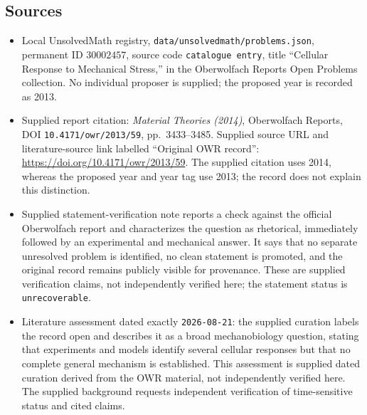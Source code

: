 \documentclass[11pt]{article}
\begin{document}
\subsection{Sources}
\begin{itemize}
\item Local UnsolvedMath registry, \texttt{data/unsolvedmath/problems.json}, permanent ID \(30002457\), source code \texttt{catalogue entry}, title ``Cellular Response to Mechanical Stress,'' in the Oberwolfach Reports Open Problems collection. No individual proposer is supplied; the proposed year is recorded as 2013.
\item Supplied report citation: \emph{Material Theories (2014)}, Oberwolfach Reports, DOI \texttt{10.4171/owr/2013/59}, pp.\ 3433--3485. Supplied source URL and literature-source link labelled ``Original OWR record'': \url{https://doi.org/10.4171/owr/2013/59}. The supplied citation uses 2014, whereas the proposed year and year tag use 2013; the record does not explain this distinction.
\item Supplied statement-verification note reports a check against the official Oberwolfach report and characterizes the question as rhetorical, immediately followed by an experimental and mechanical answer. It says that no separate unresolved problem is identified, no clean statement is promoted, and the original record remains publicly visible for provenance. These are supplied verification claims, not independently verified here; the statement status is \texttt{unrecoverable}.
\item Literature assessment dated exactly \texttt{2026-08-21}: the supplied curation labels the record open and describes it as a broad mechanobiology question, stating that experiments and models identify several cellular responses but that no complete general mechanism is established. This assessment is supplied dated curation derived from the OWR material, not independently verified here. The supplied background requests independent verification of time-sensitive status and cited claims.
\end{itemize}
\end{document}
